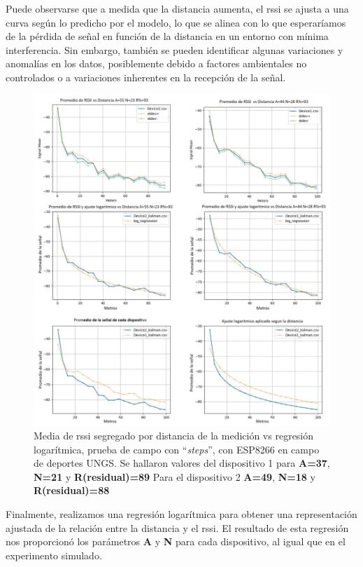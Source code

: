 Puede observarse que a medida que la distancia aumenta, el \acs{rssi} se ajusta a una curva según lo predicho por el modelo, lo que se alinea con lo que esperaríamos de la pérdida de señal en función de la distancia en un entorno con mínima interferencia. Sin embargo, también se pueden identificar algunas variaciones y anomalías en los datos, posiblemente debido a factores ambientales no controlados o a variaciones inherentes en la recepción de la señal.
\begin{figure}
	\centering
	\includegraphics[width=1\textwidth]{Figuras/profiling/preliminar-experiment.jpg}
	\captionsetup{margin=2cm}
	\caption[Media de \acs{rssi} segregado por distancia de la medición vs regresión logarítmica, prueba de campo]{Media de \acs{rssi} segregado por distancia de la medición vs regresión logarítmica, prueba de campo con “\textit{steps}”, con ESP8266 en campo de deportes UNGS. Se hallaron valores del dispositivo 1 para \textbf{A=37}, \textbf{N=21} y \textbf{R(residual)=89}
    Para el dispositivo 2 \textbf{A=49}, \textbf{N=18} y \textbf{R(residual)=88}}
\label{fig:dev2-dev1-regression}
\end{figure}
Finalmente, realizamos una regresión logarítmica para obtener una representación ajustada de la relación entre la distancia y el \acs{rssi}. El resultado de esta regresión nos proporcionó los parámetros \textbf{A} y \textbf{N} para cada dispositivo, al igual que en el experimento simulado.




